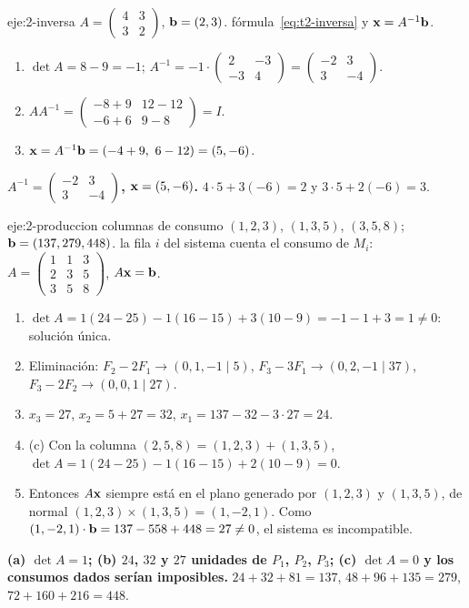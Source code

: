 \begin{solucion}{eje:2-inversa}
\datos $A=\begin{pmatrix}4&3\\3&2\end{pmatrix}$, $\mathbf{b}=(2,3)$.
\planteamiento fórmula~\eqref{eq:t2-inversa} y $\mathbf{x}=A^{-1}\mathbf{b}$.
\pasos
\begin{enumerate}[label=\arabic*.]
  \item $\det A=8-9=-1$; $A^{-1}=-1\cdot\begin{pmatrix}2&-3\\-3&4\end{pmatrix}=\begin{pmatrix}-2&3\\3&-4\end{pmatrix}$.
  \item $AA^{-1}=\begin{pmatrix}-8+9&12-12\\-6+6&9-8\end{pmatrix}=I$.
  \item $\vx=A^{-1}\vb=(-4+9,\ 6-12)=(5,-6)$.
\end{enumerate}
\resultado \textbf{$A^{-1}=\begin{pmatrix}-2&3\\3&-4\end{pmatrix}$, $\mathbf{x}=(5,-6)$.}
\comprobacion $4\cdot5+3(-6)=2$ y $3\cdot5+2(-6)=3$.
\end{solucion}

\begin{solucion}{eje:2-produccion}
\datos columnas de consumo $(1,2,3)$, $(1,3,5)$, $(3,5,8)$; $\mathbf{b}=(137,279,448)$.
\planteamiento la fila $i$ del sistema cuenta el consumo de $M_i$: $A=\begin{pmatrix}1&1&3\\2&3&5\\3&5&8\end{pmatrix}$, $A\mathbf{x}=\mathbf{b}$.
\pasos
\begin{enumerate}[label=\arabic*.]
  \item $\det A=1(24-25)-1(16-15)+3(10-9)=-1-1+3=1\neq0$: solución única.
  \item Eliminación: $F_2-2F_1\to(0,1,-1\mid5)$, $F_3-3F_1\to(0,2,-1\mid37)$, $F_3-2F_2\to(0,0,1\mid27)$.
  \item $x_3=27$, $x_2=5+27=32$, $x_1=137-32-3\cdot27=24$.
  \item (c) Con la columna $(2,5,8)=(1,2,3)+(1,3,5)$, $\det A=1(24-25)-1(16-15)+2(10-9)=0$.
  \item Entonces $A\mathbf{x}$ siempre está en el plano generado por $(1,2,3)$ y $(1,3,5)$, de normal $(1,2,3)\times(1,3,5)=(1,-2,1)$. Como $(1,-2,1)\cdot\mathbf{b}=137-558+448=27\neq0$, el sistema es incompatible.
\end{enumerate}
\resultado \textbf{(a) $\det A=1$; (b) $24$, $32$ y $27$ unidades de $P_1$, $P_2$, $P_3$; (c) $\det A=0$ y los consumos dados serían imposibles.}
\comprobacion $24+32+81=137$, $48+96+135=279$, $72+160+216=448$.
\end{solucion}

